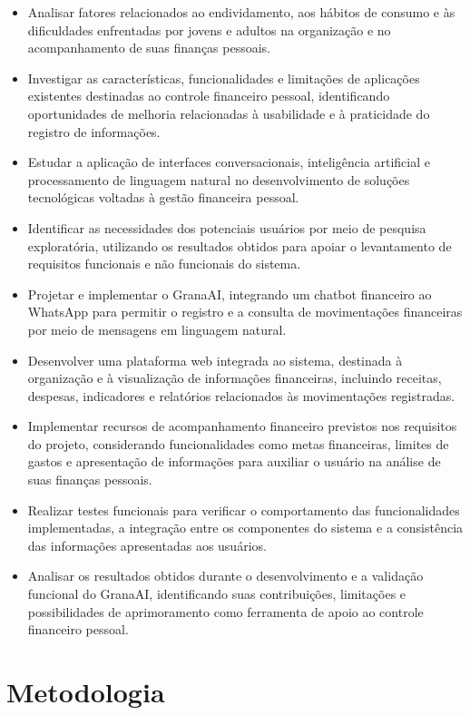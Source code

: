 \begin{itemize}
    \item Analisar fatores relacionados ao endividamento, aos hábitos de consumo e às dificuldades enfrentadas por jovens e adultos na organização e no acompanhamento de suas finanças pessoais.
    \item Investigar as características, funcionalidades e limitações de aplicações existentes destinadas ao controle financeiro pessoal, identificando oportunidades de melhoria relacionadas à usabilidade e à praticidade do registro de informações.
    \item Estudar a aplicação de interfaces conversacionais, inteligência artificial e processamento de linguagem natural no desenvolvimento de soluções tecnológicas voltadas à gestão financeira pessoal.
    \item Identificar as necessidades dos potenciais usuários por meio de pesquisa exploratória, utilizando os resultados obtidos para apoiar o levantamento de requisitos funcionais e não funcionais do sistema.
    \item Projetar e implementar o GranaAI, integrando um chatbot financeiro ao WhatsApp para permitir o registro e a consulta de movimentações financeiras por meio de mensagens em linguagem natural.
    \item Desenvolver uma plataforma web integrada ao sistema, destinada à organização e à visualização de informações financeiras, incluindo receitas, despesas, indicadores e relatórios relacionados às movimentações registradas.
    \item Implementar recursos de acompanhamento financeiro previstos nos requisitos do projeto, considerando funcionalidades como metas financeiras, limites de gastos e apresentação de informações para auxiliar o usuário na análise de suas finanças pessoais.
    \item Realizar testes funcionais para verificar o comportamento das funcionalidades implementadas, a integração entre os componentes do sistema e a consistência das informações apresentadas aos usuários.
    \item Analisar os resultados obtidos durante o desenvolvimento e a validação funcional do GranaAI, identificando suas contribuições, limitações e possibilidades de aprimoramento como ferramenta de apoio ao controle financeiro pessoal.

\end{itemize}

\section{Metodologia}

